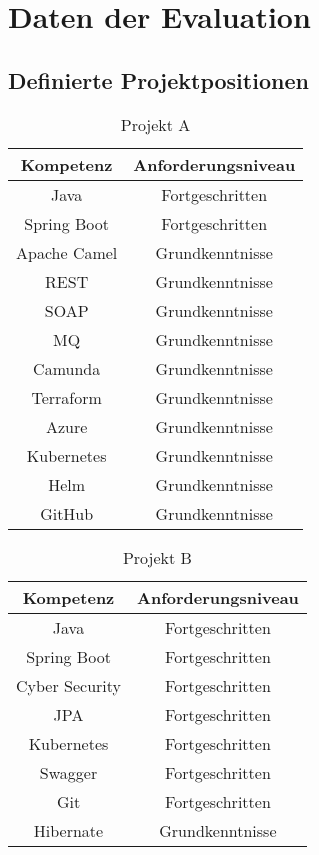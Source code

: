 \chapter{Daten der Evaluation}
\label{ch:appendix:projektpositionen}
\section{Definierte Projektpositionen}
\label{ch:appendix:projektpositionen:projektpositionen}
\begin{table}[h]
	\centering
	\begin{tabular}[h]{c|c}
		Kompetenz    & Anforderungsniveau\\
		\hline
		Java         & Fortgeschritten\\
		Spring Boot  & Fortgeschritten\\
		Apache Camel & Grundkenntnisse\\
		REST         & Grundkenntnisse\\
		SOAP         & Grundkenntnisse\\
		MQ           & Grundkenntnisse\\
		Camunda      & Grundkenntnisse\\
		Terraform    & Grundkenntnisse\\
		Azure        & Grundkenntnisse\\
		Kubernetes   & Grundkenntnisse\\
		Helm         & Grundkenntnisse\\
		GitHub       & Grundkenntnisse\\
	\end{tabular}
	\caption{Projekt A}
	\label{tbl:appendix:projektpositionen:projektpositionen:tbl1:projektA}
\end{table}

\begin{table}[h]
	\centering
	\begin{tabular}[h]{c|c}
		Kompetenz      & Anforderungsniveau\\
		\hline
		Java           & Fortgeschritten\\
		Spring Boot    & Fortgeschritten\\
		Cyber Security & Fortgeschritten\\
		JPA            & Fortgeschritten\\
		Kubernetes     & Fortgeschritten\\
		Swagger        & Fortgeschritten\\
		Git            & Fortgeschritten\\
		Hibernate      & Grundkenntnisse\\
	\end{tabular}
	\caption{Projekt B}
	\label{tbl:appendix:projektpositionen:projektpositionen:tbl1:projektB}
\end{table}

